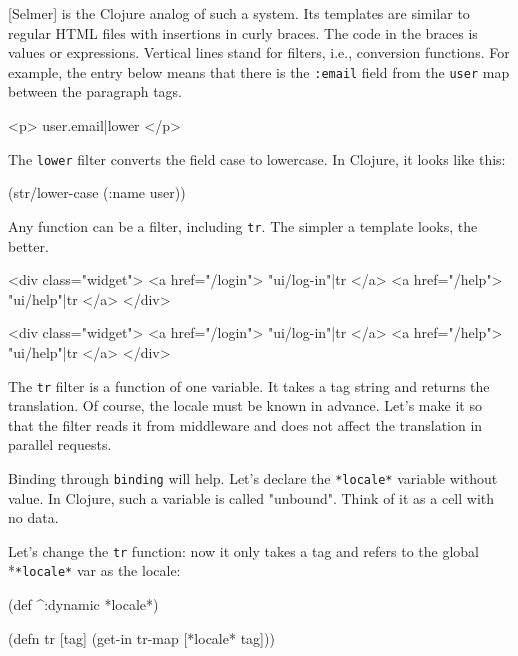 
[Selmer] is the Clojure analog of such a system.
Its templates are similar to regular HTML files with insertions in curly braces.
The code in the braces is values or expressions.
Vertical lines stand for filters, i.e., conversion functions.
For example, the entry below means that there is the \verb|:email| field from the \verb|user| map between the paragraph tags.

\begin{htmldjango}
<p>{{ user.email|lower }}</p>
\end{htmldjango}

\noindent
The \verb|lower| filter converts the field case to lowercase.
In Clojure, it looks like this:

\begin{clojure}
(str/lower-case (:name user))
\end{clojure}

Any function can be a filter, including \verb|tr|.
The simpler a template looks, the better.

\ifx\DEVICETYPE\MOBILE

\begin{htmldjango}
<div class="widget">
  <a href="/login">
    {{ "ui/log-in"|tr }}
  </a>
  <a href="/help">
    {{ "ui/help"|tr }}
  </a>
</div>
\end{htmldjango}

\else

\begin{htmldjango}
<div class="widget">
  <a href="/login">{{ "ui/log-in"|tr }}</a>
  <a href="/help">{{ "ui/help"|tr }}</a>
</div>
\end{htmldjango}

\fi

The \verb|tr| filter is a function of one variable.
It takes a tag string and returns the translation. Of course, the locale must be known in advance.
Let's make it so that the filter reads it from middleware and does not affect the translation in parallel requests.

Binding through \verb|binding| will help.
Let's declare the \verb|*locale*| variable without value. In Clojure, such a variable is called "unbound".
Think of it as a cell with no data.

Let's change the \verb|tr| function: now it only takes a tag and refers to the global *\verb|*locale*| var as the locale:

\begin{clojure}
(def ^:dynamic *locale*)

(defn tr [tag]
  (get-in tr-map [*locale* tag]))
\end{clojure}

